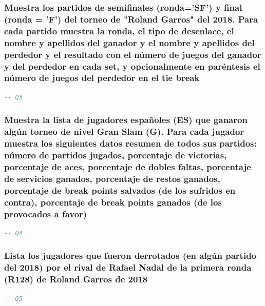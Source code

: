 \documentclass[11pt]{opticajnl}
\begin{document}
\subsubsection{Muestra los partidos de semiﬁnales (ronda='SF') y ﬁnal (ronda = 'F') del torneo de "Roland Garros" del 2018. Para cada partido muestra la ronda, el tipo de desenlace, el nombre y apellidos del ganador y el nombre y apellidos del perdedor y el resultado con el número de juegos del ganador y del perdedor en cada set, y opcionalmente en paréntesis el número de juegos del perdedor en el tie break}

\begin{lstlisting}[language=SQL]
-- Q3
\end{lstlisting}





\subsubsection{Muestra la lista de jugadores españoles (ES) que ganaron algún torneo de nivel Gran Slam (G). Para cada jugador muestra los siguientes datos resumen de todos sus partidos: número de partidos jugados, porcentaje de victorias, porcentaje de aces, porcentaje de dobles faltas, porcentaje de servicios ganados, porcentaje de restos ganados, porcentaje de break points salvados (de los sufridos en contra), porcentaje de break points ganados (de los provocados a favor)}

\begin{lstlisting}[language=SQL]
-- Q4
\end{lstlisting}





\subsubsection{Lista los jugadores que fueron derrotados (en algún partido del 2018) por el rival de Rafael Nadal de la primera ronda (R128) de Roland Garros de 2018}

\begin{lstlisting}[language=SQL]
-- Q5
\end{lstlisting}
\end{document}
